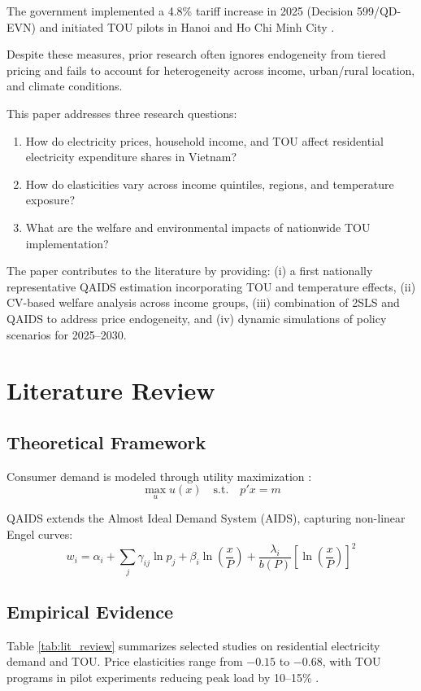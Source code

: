 \documentclass[12pt,a4paper]{article}
\begin{document}
	The government implemented a 4.8\% tariff increase in 2025 (Decision 599/QD-EVN) and initiated TOU pilots in Hanoi and Ho Chi Minh City \citep{evn2025}.  
	
	Despite these measures, prior research often ignores endogeneity from tiered pricing and fails to account for heterogeneity across income, urban/rural location, and climate conditions.  
	
	This paper addresses three research questions:
	\begin{enumerate}
		\item How do electricity prices, household income, and TOU affect residential electricity expenditure shares in Vietnam?
		\item How do elasticities vary across income quintiles, regions, and temperature exposure?
		\item What are the welfare and environmental impacts of nationwide TOU implementation?
	\end{enumerate}
	
	The paper contributes to the literature by providing: (i) a first nationally representative QAIDS estimation incorporating TOU and temperature effects, (ii) CV-based welfare analysis across income groups, (iii) combination of 2SLS and QAIDS to address price endogeneity, and (iv) dynamic simulations of policy scenarios for 2025--2030.
	
	\section{Literature Review}
	\subsection{Theoretical Framework}
	Consumer demand is modeled through utility maximization \citep{varian1992}:
	\[
	\max_u u(x) \quad \text{s.t.} \quad p'x = m
	\]
	
	QAIDS \citep{banks1997} extends the Almost Ideal Demand System (AIDS), capturing non-linear Engel curves:
	\[
	w_i = \alpha_i + \sum_j \gamma_{ij} \ln p_j + \beta_i \ln\left(\frac{x}{P}\right) + \frac{\lambda_i}{b(P)} \left[\ln\left(\frac{x}{P}\right)\right]^2
	\]
	
	\subsection{Empirical Evidence}
	Table \ref{tab:lit_review} summarizes selected studies on residential electricity demand and TOU. Price elasticities range from $-0.15$ to $-0.68$, with TOU programs in pilot experiments reducing peak load by 10--15\% \citep{faruqui2010, jessoe2014}.  
	
\end{document}
